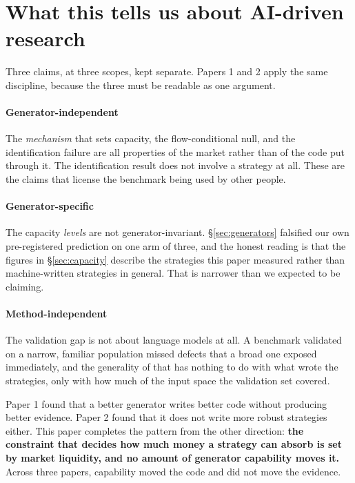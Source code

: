 \documentclass[11pt,a4paper]{article}
\begin{document}
\section{What this tells us about AI-driven research}
\label{sec:meaning}

Three claims, at three scopes, kept separate. Papers 1 and 2 apply the same discipline, because the
three must be readable as one argument.

\paragraph{Generator-independent \tagindep} The \emph{mechanism} that sets capacity, the
flow-conditional null, and the identification failure are all properties of the market rather than
of the code put through it. The identification result does not involve a strategy at all. These
are the claims that license the benchmark being used by other people.

\paragraph{Generator-specific \taglocal} The capacity \emph{levels} are not
generator-invariant. \S\ref{sec:generators} falsified our own pre-registered prediction on one arm
of three, and the honest reading is that the figures in \S\ref{sec:capacity} describe the
strategies this paper measured rather than machine-written strategies in general. That is narrower
than we expected to be claiming.

\paragraph{Method-independent \tagmethod} The validation gap is not about language models at all.
A benchmark validated on a narrow, familiar population missed defects that a broad one exposed
immediately, and the generality of that has nothing to do with what wrote the strategies, only with
how much of the input space the validation set covered.

\begin{finding}
Paper 1 found that a better generator writes better code without producing better evidence. Paper
2 found that it does not write more robust strategies either. This paper completes the pattern
from the other direction: \textbf{the constraint that decides how much money a strategy can absorb is
set by market liquidity, and no amount of generator capability moves it.} Across three papers,
capability moved the code and did not move the evidence.
\end{finding}
\end{document}
